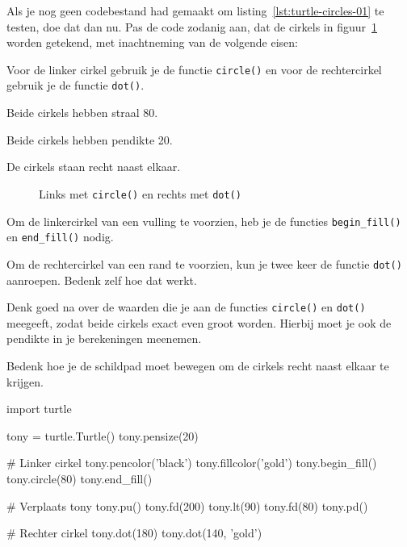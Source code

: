 \documentclass[../main]{subfiles}
\begin{document}
\begin{opgave}[icons={laptop}]
Als je nog geen codebestand  had gemaakt om listing~\ref{lst:turtle-circles-01} te testen, doe dat dan nu. Pas de code zodanig aan, dat de cirkels in figuur~\ref{fig:turtle-circle-and-dot} worden getekend, met inachtneming van de volgende eisen:
\begin{tasklist}
\item Voor de linker cirkel gebruik je de functie \texttt{circle()} en voor de rechtercirkel gebruik je de functie \texttt{dot()}.
\item Beide cirkels hebben straal 80.
\item Beide cirkels hebben pendikte 20.
\item De cirkels staan recht naast elkaar.
\end{tasklist}

\begin{figure}[ht]
    \centering
    \caption{Links met \texttt{circle()} en rechts met \texttt{dot()}}%
    \label{fig:turtle-circle-and-dot}
\end{figure}

\begin{hints}
\item Om de linkercirkel van een vulling te voorzien, heb je de functies \texttt{begin\_fill()} en \texttt{end\_fill()} nodig.
\item Om de rechtercirkel van een rand te voorzien, kun je twee keer de functie \texttt{dot()} aanroepen. Bedenk zelf hoe dat werkt.
\item Denk goed na over de waarden die je aan de functies \texttt{circle()} en \texttt{dot()} meegeeft, zodat beide cirkels exact even groot worden. Hierbij moet je ook de pendikte in je berekeningen meenemen.
\item Bedenk hoe je de schildpad moet bewegen om de cirkels recht naast elkaar te krijgen.
\end{hints}
\end{opgave}
\begin{antwoord}
\begin{python-breakable}[style=mu-noframe]
import turtle

tony = turtle.Turtle()
tony.pensize(20)

# Linker cirkel
tony.pencolor('black')
tony.fillcolor('gold')
tony.begin_fill()
tony.circle(80)
tony.end_fill()

# Verplaats tony
tony.pu()
tony.fd(200)
tony.lt(90)
tony.fd(80)
tony.pd()

# Rechter cirkel
tony.dot(180)
tony.dot(140, 'gold')
\end{python-breakable}
\end{antwoord}
\end{document}
